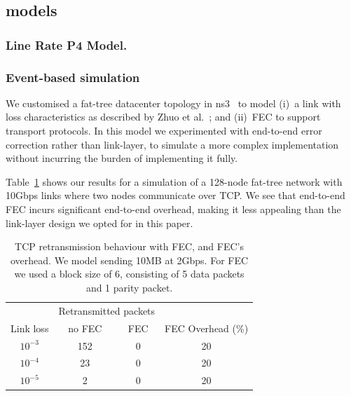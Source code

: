 \subsection{\OurSys models}

\subsubsection{Line Rate P4 Model.} 




\subsubsection{Event-based simulation}
We customised a fat-tree datacenter topology in ns3~\cite{ns3-dcn} to
model (i)~a link with loss characteristics as described by Zhuo et
al.~\cite{Zhuo:2017:UMP:3098822.3098849}; and (ii)~FEC to support
transport protocols. In this model we experimented with end-to-end
error correction rather than link-layer, to simulate a more complex
implementation without incurring the burden of implementing it fully.

Table~\ref{tab:ns3} shows our results for a simulation of a 128-node
fat-tree network with 10Gbps links where two nodes communicate over
TCP. We see that end-to-end FEC incurs significant end-to-end
overhead, making it less appealing than the link-layer design we opted
for in this paper.

\begin{table}
\begin{center}
\small
\begin{tabular}{c|cc|c}
\toprule
 & \multicolumn{2}{|c|}{Retransmitted packets} & \\
Link loss & no FEC & FEC & FEC Overhead (\%) \\
\midrule
$10^{-3}$ & 152  & 0 & 20 \\
$10^{-4}$ & 23   & 0 & 20 \\
$10^{-5}$ & 2    & 0 & 20 \\
\bottomrule
\end{tabular}
\caption{TCP retransmission behaviour with FEC, and FEC's overhead.
  We model sending 10MB at 2Gbps. For FEC we used a block size of 6,
  consisting of 5 data packets and 1 parity packet.
}
\label{tab:ns3}
\end{center}
\end{table}


